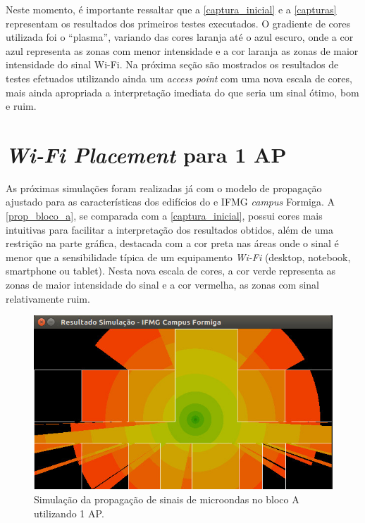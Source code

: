 \documentclass[
	12pt,				%
	twoside,			%
	a4paper,			%
	english,			%
	french,				%
	spanish,			%
	brazil				%
	]{abntex2}
\begin{document}
Neste momento, é importante ressaltar que a \autoref{captura_inicial} e
a \autoref{capturas} representam os resultados dos primeiros testes
executados. O gradiente de cores utilizada foi o ``plasma'', variando
das cores laranja até o azul escuro, onde a cor azul representa as zonas
com menor intensidade e a cor laranja as zonas de maior intensidade do
sinal Wi-Fi. Na próxima seção são mostrados os resultados de testes
efetuados utilizando ainda um \emph{access point} com uma nova escala de
cores, mais ainda apropriada a interpretação imediata do que seria um
sinal ótimo, bom e ruim.

\section{\texorpdfstring{\emph{Wi-Fi Placement} para 1
AP}{Wi-Fi Placement para 1 AP}}\label{wi-fi-placement-para-1-ap}

As próximas simulações foram realizadas já com o modelo de propagação
ajustado para as características dos edifícios do e IFMG \emph{campus}
Formiga. A \autoref{prop_bloco_a}, se comparada com a
\autoref{captura_inicial}, possui cores mais intuitivas para facilitar a
interpretação dos resultados obtidos, além de uma restrição na parte
gráfica, destacada com a cor preta nas áreas onde o sinal é menor que a
sensibilidade típica de um equipamento \emph{Wi-Fi} (desktop, notebook,
smartphone ou tablet). Nesta nova escala de cores, a cor verde
representa as zonas de maior intensidade do sinal e a cor vermelha, as
zonas com sinal relativamente ruim.

\begin{figure}[ht]
    \caption{\label{prop_bloco_a} Simulação da propagação de sinais de microondas no bloco A utilizando 1 AP.}
    \begin{center}
        \includegraphics[scale=0.7]{imagens/prop-bloco-a-2.jpg}
    \end{center}
\end{figure}
\end{document}
